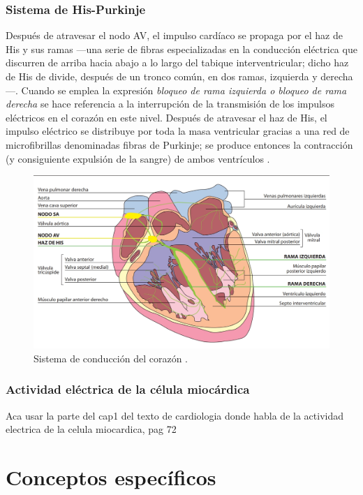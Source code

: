 \documentclass[spanish,11pt,letterpaper,oneside]{memoir}
\begin{document}
	\subsubsection{Sistema de His-Purkinje}
	Después de atravesar el nodo AV, el impulso cardíaco se propaga por el haz de His y sus ramas ---una serie de fibras especializadas en la conducción eléctrica que discurren de arriba hacia abajo a lo largo del tabique interventricular; dicho haz de His de divide, después de un tronco común, en dos ramas, izquierda y derecha---. Cuando se emplea la expresión \textit{bloqueo de rama izquierda o bloqueo de rama derecha} se hace referencia a la interrupción de la transmisión de los impulsos eléctricos en el corazón en este nivel. Después de atravesar el haz de His, el impulso eléctrico se distribuye por toda la masa ventricular gracias a una red de microfibrillas denominadas fibras de Purkinje; se produce entonces la contracción (y consiguiente expulsión de la sangre) de ambos ventrículos \cite{fbbva}.
	\begin{figure}[h]
		\centering
		\includegraphics[width=0.9\linewidth]{Sem_1/figuras/Sistema_de_conduccion_corazon.jpeg}
		\caption{Sistema de conducción del corazón \cite{fbbva}.}
		\label{fig:sis_cond_heart}
	\end{figure}
	\subsubsection*{Actividad eléctrica de la célula miocárdica}
	Aca usar la parte del cap1 del texto de cardiologia donde habla de la actividad electrica de la celula miocardica, pag 72 
	

\section{Conceptos específicos}
\end{document}
